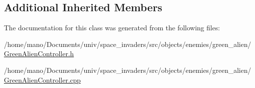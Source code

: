 \subsection*{Additional Inherited Members}


The documentation for this class was generated from the following files\+:\begin{DoxyCompactItemize}
\item 
/home/mano/\+Documents/univ/space\+\_\+invaders/src/objects/enemies/green\+\_\+alien/\hyperlink{GreenAlienController_8h}{Green\+Alien\+Controller.\+h}\item
/home/mano/\+Documents/univ/space\+\_\+invaders/src/objects/enemies/green\+\_\+alien/\hyperlink{GreenAlienController_8cpp}{Green\+Alien\+Controller.\+cpp}\end{DoxyCompactItemize}
